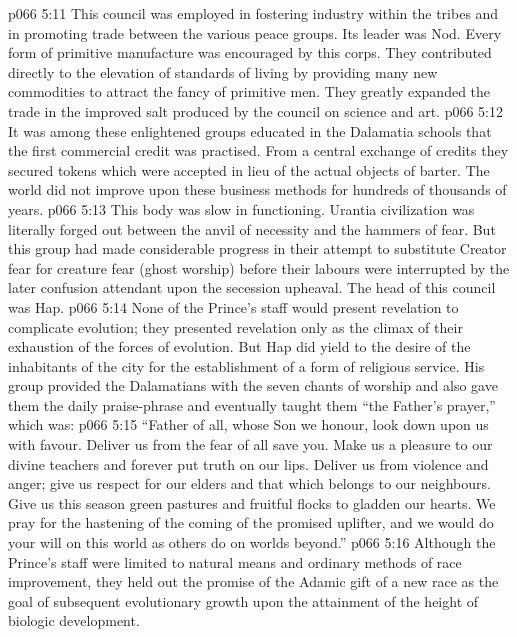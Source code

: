 \vs p066 5:11 \bibnobreakspace {} This council was employed in fostering industry within the tribes and in promoting trade between the various peace groups. Its leader was Nod. Every form of primitive manufacture was encouraged by this corps. They contributed directly to the elevation of standards of living by providing many new commodities to attract the fancy of primitive men. They greatly expanded the trade in the improved salt produced by the council on science and art.
\vs p066 5:12 It was among these enlightened groups educated in the Dalamatia schools that the first commercial credit was practised. From a central exchange of credits they secured tokens which were accepted in lieu of the actual objects of barter. The world did not improve upon these business methods for hundreds of thousands of years.
\vs p066 5:13 \bibnobreakspace {} This body was slow in functioning. Urantia civilization was literally forged out between the anvil of necessity and the hammers of fear. But this group had made considerable progress in their attempt to substitute Creator fear for creature fear (ghost worship) before their labours were interrupted by the later confusion attendant upon the secession upheaval. The head of this council was Hap.
\vs p066 5:14 None of the Prince’s staff would present revelation to complicate evolution; they presented revelation only as the climax of their exhaustion of the forces of evolution. But Hap did yield to the desire of the inhabitants of the city for the establishment of a form of religious service. His group provided the Dalamatians with the seven chants of worship and also gave them the daily praise\hyp{}phrase and eventually taught them “the Father’s prayer,” which was:
\vs p066 5:15 \pc “Father of all, whose Son we honour, look down upon us with favour. Deliver us from the fear of all save you. Make us a pleasure to our divine teachers and forever put truth on our lips. Deliver us from violence and anger; give us respect for our elders and that which belongs to our neighbours. Give us this season green pastures and fruitful flocks to gladden our hearts. We pray for the hastening of the coming of the promised uplifter, and we would do your will on this world as others do on worlds beyond.”
\vs p066 5:16 \pc Although the Prince’s staff were limited to natural means and ordinary methods of race improvement, they held out the promise of the Adamic gift of a new race as the goal of subsequent evolutionary growth upon the attainment of the height of biologic development.
